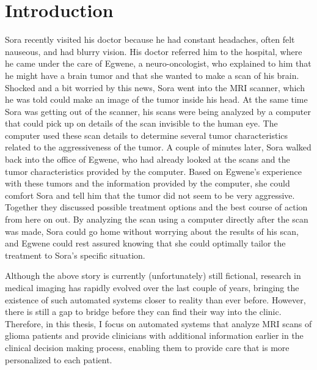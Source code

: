 
\chapter{Introduction}

\begin{ChapterAbstractNoTitle}
Sora recently visited his doctor because he had constant headaches, often felt nauseous, and had blurry vision.
His doctor referred him to the hospital, where he came under the care of Egwene, a neuro-oncologist, who explained to him that he might have a brain \gls{tumor} and that she wanted to make a scan of his brain.
Shocked and a bit worried by this news, Sora went into the MRI scanner, which he was told could make an image of the \gls{tumor} inside his head.
At the same time Sora was getting out of the scanner, his scans were being analyzed by a computer that could pick up on details of the scan invisible to the human eye.
The computer used these scan details to determine several \gls{tumor} characteristics related to the aggressiveness of the \gls{tumor}.
A couple of minutes later, Sora walked back into the office of Egwene, who had already looked at the scans and the \gls{tumor} characteristics provided by the computer.
Based on Egwene's experience with these \glspl{tumor} and the information provided by the computer, she could comfort Sora and tell him that the \gls{tumor} did not seem to be very aggressive.
Together they discussed possible treatment options and the best course of action from here on out.
By analyzing the scan using a computer directly after the scan was made, Sora could go home without worrying about the results of his scan, and Egwene could rest assured knowing that she could optimally tailor the treatment to Sora's specific situation.
\end{ChapterAbstractNoTitle}

Although the above story is currently (unfortunately) still fictional, research in medical imaging has rapidly evolved over the last couple of years, bringing the existence of such automated systems closer to reality than ever before.
However, there is still a gap to bridge before they can find their way into the clinic.
Therefore, in this thesis, I focus on automated systems that analyze \acrshort{MRI} scans of glioma patients and provide clinicians with additional information earlier in the clinical decision making process, enabling them to provide care that is more personalized to each patient.

